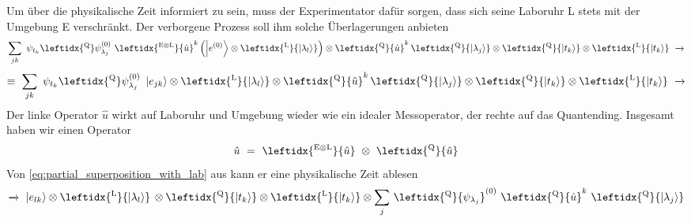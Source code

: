 \documentclass[12pt]{article}
\begin{document}
Um über die physikalische Zeit informiert zu sein, muss der Experimentator dafür sorgen, dass sich seine Laboruhr L stets mit der Umgebung E verschränkt. Der verborgene Prozess soll ihm solche Überlagerungen anbieten
\begin{equation*}
\sum_{jk} \ \psi_{t_k} \leftidx{^\mathrm{Q}}\psi_{\lambda_j}^{(0)}\ 
\leftidx{^\mathrm{E \otimes L}}{\hat{u}}^k \left( \ket{e^{(0)}} \otimes \leftidx{^\mathrm{L}}{\ket{\lambda_l}} \right) 
\otimes \leftidx{^\mathrm{Q}}{\hat{u}}^{k}\, \leftidx{^\mathrm{Q}}{\ket{\lambda_j}}
\otimes \leftidx{^\mathrm{Q}}{\ket{t_k}}
\otimes \leftidx{^\mathrm{L}}{\ket{t_k}}
\ \xrightarrow{}
\end{equation*}
\begin{equation}
\label{eq:partial_superposition_with_lab}
\equiv\ \sum_{jk} \ \psi_{t_k} \leftidx{^\mathrm{Q}}\psi_{\lambda_j}^{(0)}\ 
\ket{e_{jk}} 
\otimes \leftidx{^\mathrm{L}}{\ket{\lambda_l}} 
\otimes \leftidx{^\mathrm{Q}}{\hat{u}}^{k}\, \leftidx{^\mathrm{Q}}{\ket{\lambda_j}}
\otimes \leftidx{^\mathrm{Q}}{\ket{t_k}}
\otimes \leftidx{^\mathrm{L}}{\ket{t_k}}
\ \xrightarrow{}
\end{equation}
Der linke Operator $\hat{u}$ wirkt auf Laboruhr und Umgebung wieder wie ein idealer Messoperator, der rechte auf das Quantending. Insgesamt haben wir einen Operator
\begin{equation}
\label{eq:unitary_2_parts}
\hat{u}\ =\ \leftidx{^\mathrm{E \otimes L}}{\hat{u}}\ \otimes\ \leftidx{^\mathrm{Q}}{\hat{u}}
\end{equation}
Von \eqref{eq:partial_superposition_with_lab} aus kann er eine physikalische Zeit ablesen
\begin{equation*}
\xrightarrow{} \ \ket{e_{lk}} 
\otimes \leftidx{^\mathrm{L}}{\ket{\lambda_l}} \,
\otimes \leftidx{^\mathrm{Q}}{\ket{t_k}}
\otimes \leftidx{^\mathrm{L}}{\ket{t_k}}
\otimes \sum_{j} \, \leftidx{^\mathrm{Q}}{\psi_{\lambda_j}}^{(0)}\ 
\leftidx{^\mathrm{Q}}{\hat{u}}^{k}\ 
\leftidx{^\mathrm{Q}}{\ket{\lambda_j}}
\end{equation*}
\end{document}
